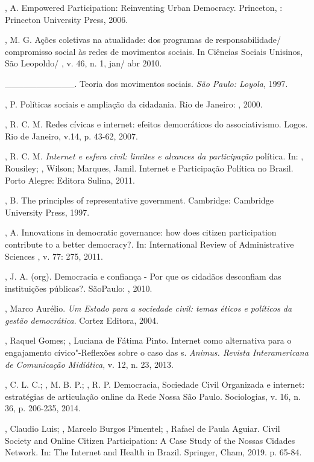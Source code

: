 \begin{Parskip}
, A. Empowered Participation: Reinventing Urban Democracy.
Princeton, : Princeton University Press, 2006.

, M. G. Ações coletivas na atualidade: dos programas de
responsabilidade/ compromisso social às redes de movimentos sociais. In
Ciências Sociais Unisinos, São Leopoldo/ , v. 46, n. 1, jan/ abr 2010.

\_\_\_\_\_\_\_\_\_\_\_. Teoria dos movimentos sociais. \emph{São Paulo:
Loyola}, 1997.

, P. Políticas sociais e ampliação da cidadania. Rio de Janeiro:
, 2000.

, R. C. M. Redes cívicas e internet: efeitos democráticos do
associativismo. Logos. Rio de Janeiro, v.14, p. 43-62, 2007.

, R. C. M. \emph{Internet e esfera civil: limites e alcances da
participação} política. In: , Rousiley; , Wilson; Marques,
Jamil. Internet e Participação Política no Brasil. Porto Alegre: Editora
Sulina, 2011.

, B. The principles of representative government. Cambridge:
Cambridge University Press, 1997.

, A. Innovations in democratic governance: how does citizen
participation contribute to a better democracy?. In: International
Review of Administrative Sciences , v. 77: 275, 2011.

, J. A. (org). Democracia e confiança - Por que os cidadãos
desconfiam das instituições públicas?. SãoPaulo: , 2010.

, Marco Aurélio. \emph{Um Estado para a sociedade civil: temas
éticos e políticos da gestão democrática}. Cortez Editora, 2004.

, Raquel Gomes; , Luciana de Fátima Pinto. Internet como
alternativa para o engajamento cívico"-Reflexões sobre o caso das s.
\emph{Animus. Revista Interamericana de Comunicação Midiática}, v. 12,
n. 23, 2013.

, C. L. C.; , M. B. P.; , R. P. Democracia,
Sociedade Civil Organizada e internet: estratégias de articulação online
da Rede Nossa São Paulo. Sociologias, v. 16, n. 36, p. 206-235, 2014.

, Claudio Luis; , Marcelo Burgos Pimentel; ,
Rafael de Paula Aguiar. Civil Society and Online Citizen Participation:
A Case Study of the Nossas Cidades Network. In: The Internet and Health
in Brazil. Springer, Cham, 2019. p. 65-84.


\end{Parskip}
